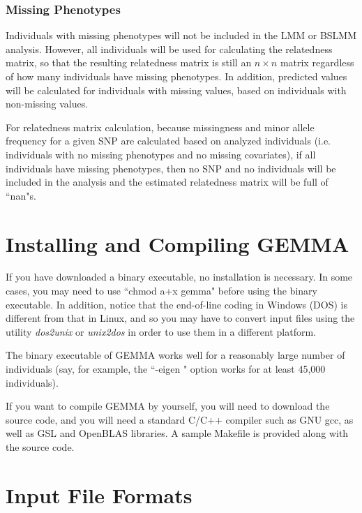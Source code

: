 \documentclass[11pt]{article}
\begin{document}
\subsubsection{Missing Phenotypes}

Individuals with missing phenotypes will not be included in the LMM or
BSLMM analysis. However, all individuals will be used for calculating
the relatedness matrix, so that the resulting relatedness matrix is
still an $n\times n$ matrix regardless of how many individuals have
missing phenotypes. In addition, predicted values will be calculated
for individuals with missing values, based on individuals with
non-missing values.

For relatedness matrix calculation, because missingness and minor
allele frequency for a given SNP are calculated based on analyzed
individuals (i.e. individuals with no missing phenotypes and no
missing covariates), if all individuals have missing phenotypes, then
no SNP and no individuals will be included in the analysis and the
estimated relatedness matrix will be full of ``nan"s.

\newpage

\section{Installing and Compiling GEMMA}

If you have downloaded a binary executable, no installation is
necessary. In some cases, you may need to use ``chmod a+x gemma"
before using the binary executable. In addition, notice that the
end-of-line coding in Windows (DOS) is different from that in Linux,
and so you may have to convert input files using the utility {\it
  dos2unix} or {\it unix2dos} in order to use them in a different
platform.

The binary executable of GEMMA works well for a reasonably large
number of individuals (say, for example, the ``-eigen " option works
for at least 45,000 individuals).

If you want to compile GEMMA by yourself, you will need to download
the source code, and you will need a standard C/C++ compiler such as
GNU gcc, as well as GSL and OpenBLAS libraries.  A sample
Makefile is provided along with the source code.

\newpage

\section{Input File Formats}
\end{document}
